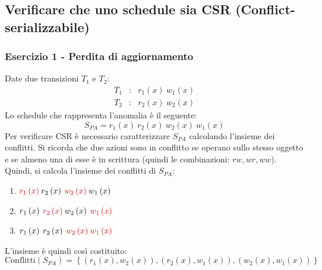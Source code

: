 \documentclass[a4paper]{article}
\begin{document}
	\subsection{Verificare che uno schedule sia CSR (Conflict-serializzabile)}
	
	\subsubsection{Esercizio 1 - Perdita di aggiornamento}
	
	Date due transizioni $T_{1}$ e $T_{2}$:
	\begin{equation*}
		\begin{array}{lll}
			T_{1} &:& r_{1}\left(x\right) \: w_{1}\left(x\right) \\
			T_{2} &:& r_{2}\left(x\right) \: w_{2}\left(x\right)
		\end{array}
	\end{equation*}
	Lo schedule che rappresenta l'anomalia è il seguente:
	\begin{equation*}
		S_{PA} = r_{1}\left(x\right) \: r_{2}\left(x\right) \: w_{2}\left(x\right) \: w_{1}\left(x\right)
	\end{equation*}
	Per verificare CSR è necessario caratterizzare $S_{PA}$ calcolando l'insieme dei conflitti. Si ricorda che due azioni sono in conflitto se operano sullo stesso oggetto e se almeno una di esse è in scrittura (quindi le combinazioni: $rw, wr, ww$). Quindi, si calcola l'insieme dei conflitti di $S_{PA}$:
	\begin{enumerate}
		\item $\textcolor{Red3}{r_{1}\left(x\right)} \: r_{2}\left(x\right) \: \textcolor{Red3}{w_{2}\left(x\right)} \: w_{1}\left(x\right)$
		
		\item $r_{1}\left(x\right) \: \textcolor{Red3}{r_{2}\left(x\right)} \: w_{2}\left(x\right) \: \textcolor{Red3}{w_{1}\left(x\right)}$
		
		\item $r_{1}\left(x\right) \: r_{2}\left(x\right) \: \textcolor{Red3}{w_{2}\left(x\right)} \: \textcolor{Red3}{w_{1}\left(x\right)}$
	\end{enumerate}
	L'insieme è quindi così costituito:
	\begin{equation*}
		\text{Conflitti}\left(S_{PA}\right) = \left\{\left(r_{1}\left(x\right), w_{2}\left(x\right)\right), \left(r_{2}\left(x\right), w_{1}\left(x\right)\right), \left(w_{2}\left(x\right), w_{1}\left(x\right)\right)\right\}
	\end{equation*}
\end{document}
